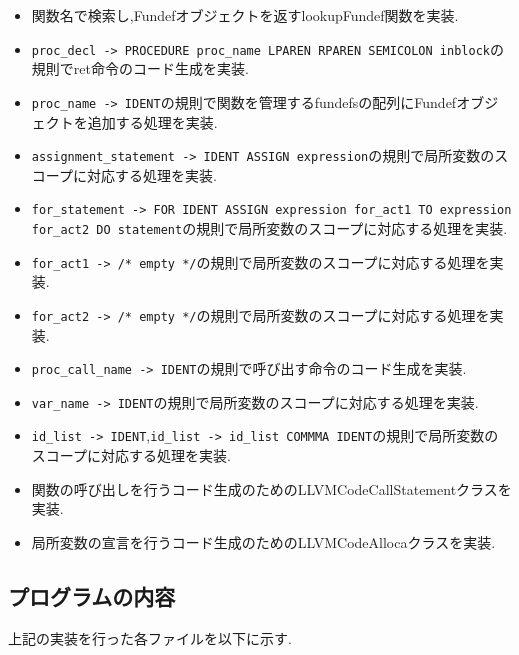 \documentclass[main]{subfiles}
\begin{document}
\begin{oframed}
\begin{itemize}
    \item 関数名で検索し,Fundefオブジェクトを返すlookupFundef関数を実装.
    \item \verb|proc_decl -> PROCEDURE proc_name LPAREN RPAREN SEMICOLON inblock|の規則でret命令のコード生成を実装.
    \item \verb|proc_name -> IDENT|の規則で関数を管理するfundefsの配列にFundefオブジェクトを追加する処理を実装.
    \item \verb|assignment_statement -> IDENT ASSIGN expression|の規則で局所変数のスコープに対応する処理を実装.
    \item \verb|for_statement -> FOR IDENT ASSIGN expression for_act1 TO expression for_act2 DO statement|の規則で局所変数のスコープに対応する処理を実装.
    \item \verb|for_act1 -> /* empty */|の規則で局所変数のスコープに対応する処理を実装.
    \item \verb|for_act2 -> /* empty */|の規則で局所変数のスコープに対応する処理を実装.
    \item \verb|proc_call_name -> IDENT|の規則で呼び出す命令のコード生成を実装.
    \item \verb|var_name -> IDENT|の規則で局所変数のスコープに対応する処理を実装.
    \item \verb|id_list -> IDENT|,\verb|id_list -> id_list COMMMA IDENT|の規則で局所変数のスコープに対応する処理を実装.
    \item 関数の呼び出しを行うコード生成のためのLLVMCodeCallStatementクラスを実装.
    \item 局所変数の宣言を行うコード生成のためのLLVMCodeAllocaクラスを実装.
\end{itemize}
\end{oframed}
\subsection{プログラムの内容}
上記の実装を行った各ファイルを以下に示す.





\end{document}
